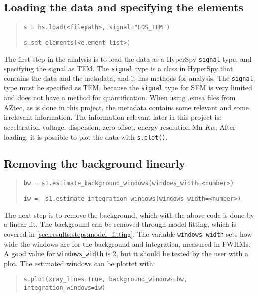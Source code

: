 \subsection{Loading the data and specifying the elements}
\label{sec:results:steps:load}
\begin{quote}
    \verb|s = hs.load(<filepath>, signal="EDS_TEM")|

    \verb|s.set_elements(<element_list>)|
\end{quote}

The first step in the analysis is to load the data as a HyperSpy \verb|signal| type, and specifying the signal as TEM.
The \verb|signal| type is a class in HyperSpy that contains the data and the metadata, and it has methods for analysis.
The \verb|signal| type must be specified as TEM, because the \verb|signal| type for SEM is very limited and does not have a method for quantification.
When using .emsa files from AZtec, as is done in this project, the metadata contains some relevant and some irrelevant information.
The information relevant later in this project is:
acceleration voltage, dispersion, zero offset, energy resolution Mn $K\alpha$,
After loading, it is possible to plot the data with \verb|s.plot()|.

\subsection{Removing the background linearly}
\label{sec:results:steps:background}
\begin{quote}
    \verb|bw = s1.estimate_background_windows(windows_width=<number>)|

    \verb|iw =  s1.estimate_integration_windows(windows_width=<number>)|
\end{quote}

The next step is to remove the background, which with the above code is done by a linear fit.
The background can be removed through model fitting, which is covered in \cref{sec:results:steps:model_fitting}.
The variable \verb|windows_width| sets how wide the windows are for the background and integration, measured in FWHMs.
A good value for \verb|windows_width| is 2, but it should be tested by the user with a plot.
The estimated windows can be plottet with:

\begin{quote}
    \verb|s.plot(xray_lines=True, background_windows=bw, integration_windows=iw)|
\end{quote}


